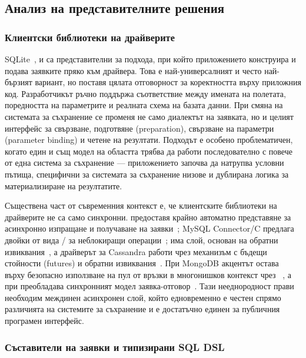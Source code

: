 \subsection{Анализ на представителните решения}

\subsubsection{Клиентски библиотеки на драйверите}

SQLite~\cite{sqlite},  и  са представителни за подхода, при който приложението конструира и подава заявките пряко към драйвера. Това е най-универсалният и често най-бързият вариант, но поставя цялата отговорност за коректността върху приложния код. Разработчикът ръчно поддържа съответствие между имената на полетата, поредността на параметрите и реалната схема на базата данни. При смяна на системата за съхранение се променя не само диалектът на заявката, но и целият интерфейс за свързване, подготвяне (preparation), свързване на параметри (parameter binding) и четене на резултати. Подходът е особено проблематичен, когато един и същ модел на областта трябва да работи последователно с повече от една система за съхранение --- приложението започва да натрупва условни пътища, специфични за системата за съхранение низове и дублирана логика за материализиране на резултатите.

Съществена част от съвременния контекст е, че клиентските библиотеки на драйверите не са само синхронни.  предоставя крайно автоматно представяне за асинхронно изпращане и получаване на заявки~\cite{libpq_async}; MySQL Connector/C предлага двойки от вида / за неблокиращи операции~\cite{mysql_capi_async};  има слой, основан на обратни извиквания~\cite{hiredis}, а драйверът за Cassandra работи чрез механизъм с бъдещи стойности (futures) и обратни извиквания~\cite{cassandra_futures}. При MongoDB акцентът остава върху безопасно използване на пул от връзки в многонишков контекст чрез ~\cite{mongoc_client_pool}, а при  преобладава синхронният модел заявка-отговор~\cite{libneo4j_client}. Тази нееднородност прави необходим междинен асинхронен слой, който едновременно е честен спрямо различията на системите за съхранение и е достатъчно единен за публичния програмен интерфейс.

\subsubsection{Съставители на заявки и типизирани SQL DSL}

